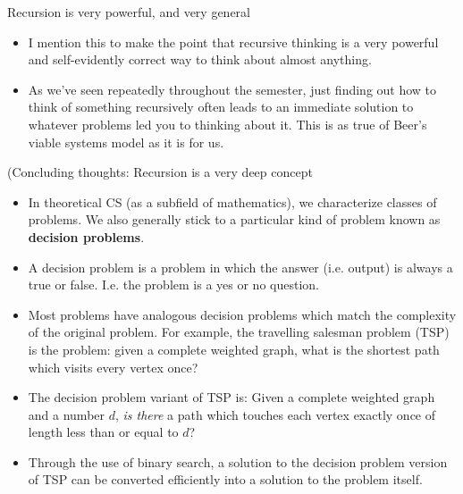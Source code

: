 \documentclass{beamer}
\begin{document}
\begin{frame}{Recursion is very powerful, and very general}
    \begin{itemize}
        \item I mention this to make the point that recursive thinking is a very powerful and self-evidently correct way to think about almost anything. 
        \item As we've seen repeatedly throughout the semester, just finding out how to think of something recursively often leads to an immediate solution to whatever problems led you to thinking about it. This is as true of Beer's viable systems model as it is for us. 
    \end{itemize}    
\end{frame}

\begin{frame}{(Concluding thoughts: Recursion is a very deep concept}
    \begin{itemize}
        \item In theoretical CS (as a subfield of mathematics), we characterize classes of problems. We also generally stick to a particular kind of problem known as \textbf{decision problems}.
        \item A decision problem is a problem in which the answer (i.e. output) is always a true or false. I.e. the problem is a yes or no question. 
        \item Most problems have analogous decision problems which match the complexity of the original problem. For example, the travelling salesman problem (TSP) is the problem: given a complete weighted graph, what is the shortest path which visits every vertex once? 
        \item The decision problem variant of TSP is: Given a complete weighted graph and a number $d$, \emph{is there} a path which touches each vertex exactly once of length less than or equal to $d$?
        \item Through the use of binary search, a solution to the decision problem version of TSP can be converted efficiently into a solution to the problem itself. 
    \end{itemize}
\end{frame}
\end{document}
